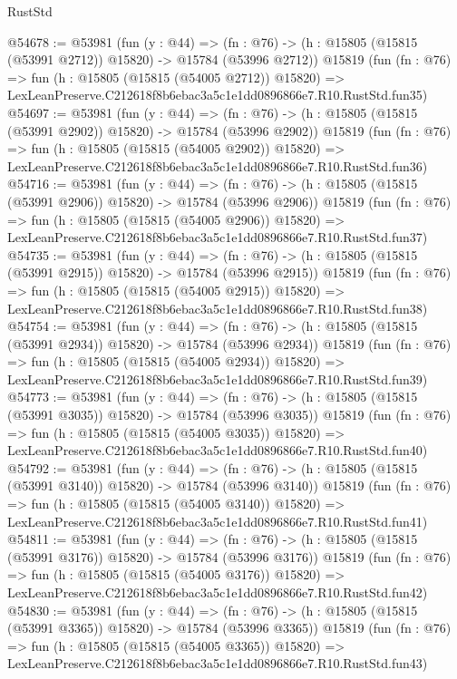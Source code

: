 \begin{lexlean}{RustStd}
\begin{coremodule}
@54678 := @53981
    (fun (y : @44) =>
    (fn : @76) -> (h : @15805 (@15815 (@53991 @2712)) @15820) -> @15784 (@53996 @2712))
    @15819
    (fun (fn : @76) =>
    fun (h : @15805 (@15815 (@54005 @2712)) @15820) =>
    LexLeanPreserve.C212618f8b6ebac3a5c1e1dd0896866e7.R10.RustStd.fun35)
@54697 := @53981
    (fun (y : @44) =>
    (fn : @76) -> (h : @15805 (@15815 (@53991 @2902)) @15820) -> @15784 (@53996 @2902))
    @15819
    (fun (fn : @76) =>
    fun (h : @15805 (@15815 (@54005 @2902)) @15820) =>
    LexLeanPreserve.C212618f8b6ebac3a5c1e1dd0896866e7.R10.RustStd.fun36)
@54716 := @53981
    (fun (y : @44) =>
    (fn : @76) -> (h : @15805 (@15815 (@53991 @2906)) @15820) -> @15784 (@53996 @2906))
    @15819
    (fun (fn : @76) =>
    fun (h : @15805 (@15815 (@54005 @2906)) @15820) =>
    LexLeanPreserve.C212618f8b6ebac3a5c1e1dd0896866e7.R10.RustStd.fun37)
@54735 := @53981
    (fun (y : @44) =>
    (fn : @76) -> (h : @15805 (@15815 (@53991 @2915)) @15820) -> @15784 (@53996 @2915))
    @15819
    (fun (fn : @76) =>
    fun (h : @15805 (@15815 (@54005 @2915)) @15820) =>
    LexLeanPreserve.C212618f8b6ebac3a5c1e1dd0896866e7.R10.RustStd.fun38)
@54754 := @53981
    (fun (y : @44) =>
    (fn : @76) -> (h : @15805 (@15815 (@53991 @2934)) @15820) -> @15784 (@53996 @2934))
    @15819
    (fun (fn : @76) =>
    fun (h : @15805 (@15815 (@54005 @2934)) @15820) =>
    LexLeanPreserve.C212618f8b6ebac3a5c1e1dd0896866e7.R10.RustStd.fun39)
@54773 := @53981
    (fun (y : @44) =>
    (fn : @76) -> (h : @15805 (@15815 (@53991 @3035)) @15820) -> @15784 (@53996 @3035))
    @15819
    (fun (fn : @76) =>
    fun (h : @15805 (@15815 (@54005 @3035)) @15820) =>
    LexLeanPreserve.C212618f8b6ebac3a5c1e1dd0896866e7.R10.RustStd.fun40)
@54792 := @53981
    (fun (y : @44) =>
    (fn : @76) -> (h : @15805 (@15815 (@53991 @3140)) @15820) -> @15784 (@53996 @3140))
    @15819
    (fun (fn : @76) =>
    fun (h : @15805 (@15815 (@54005 @3140)) @15820) =>
    LexLeanPreserve.C212618f8b6ebac3a5c1e1dd0896866e7.R10.RustStd.fun41)
@54811 := @53981
    (fun (y : @44) =>
    (fn : @76) -> (h : @15805 (@15815 (@53991 @3176)) @15820) -> @15784 (@53996 @3176))
    @15819
    (fun (fn : @76) =>
    fun (h : @15805 (@15815 (@54005 @3176)) @15820) =>
    LexLeanPreserve.C212618f8b6ebac3a5c1e1dd0896866e7.R10.RustStd.fun42)
@54830 := @53981
    (fun (y : @44) =>
    (fn : @76) -> (h : @15805 (@15815 (@53991 @3365)) @15820) -> @15784 (@53996 @3365))
    @15819
    (fun (fn : @76) =>
    fun (h : @15805 (@15815 (@54005 @3365)) @15820) =>
    LexLeanPreserve.C212618f8b6ebac3a5c1e1dd0896866e7.R10.RustStd.fun43)

\end{coremodule}
\end{lexlean}
